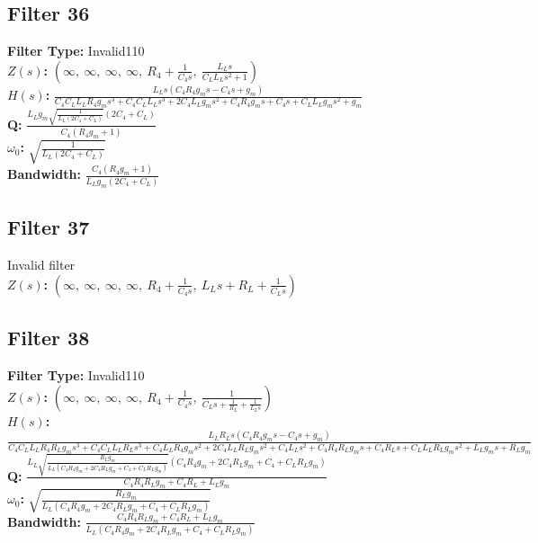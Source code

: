 \documentclass{article}
\begin{document}
\subsection*{Filter 36}
\textbf{Filter Type:} Invalid110 \\ 
\textbf{$Z(s)$:} $\left( \infty, \  \infty, \  \infty, \  \infty, \  R_{4} + \frac{1}{C_{4} s}, \  \frac{L_{L} s}{C_{L} L_{L} s^{2} + 1}\right)$ \\ 
\textbf{$H(s)$:} $\frac{L_{L} s \left(C_{4} R_{4} g_{m} s - C_{4} s + g_{m}\right)}{C_{4} C_{L} L_{L} R_{4} g_{m} s^{3} + C_{4} C_{L} L_{L} s^{3} + 2 C_{4} L_{L} g_{m} s^{2} + C_{4} R_{4} g_{m} s + C_{4} s + C_{L} L_{L} g_{m} s^{2} + g_{m}}$ \\ 
\textbf{Q:} $\frac{L_{L} g_{m} \sqrt{\frac{1}{L_{L} \left(2 C_{4} + C_{L}\right)}} \left(2 C_{4} + C_{L}\right)}{C_{4} \left(R_{4} g_{m} + 1\right)}$ \\ 
\textbf{$\omega_0$:} $\sqrt{\frac{1}{L_{L} \left(2 C_{4} + C_{L}\right)}}$ \\ 
\textbf{Bandwidth:} $\frac{C_{4} \left(R_{4} g_{m} + 1\right)}{L_{L} g_{m} \left(2 C_{4} + C_{L}\right)}$ \\ 
\subsection*{Filter 37}
Invalid filter \\ 
\textbf{$Z(s)$:} $\left( \infty, \  \infty, \  \infty, \  \infty, \  R_{4} + \frac{1}{C_{4} s}, \  L_{L} s + R_{L} + \frac{1}{C_{L} s}\right)$ \\ 
\subsection*{Filter 38}
\textbf{Filter Type:} Invalid110 \\ 
\textbf{$Z(s)$:} $\left( \infty, \  \infty, \  \infty, \  \infty, \  R_{4} + \frac{1}{C_{4} s}, \  \frac{1}{C_{L} s + \frac{1}{R_{L}} + \frac{1}{L_{L} s}}\right)$ \\ 
\textbf{$H(s)$:} $\frac{L_{L} R_{L} s \left(C_{4} R_{4} g_{m} s - C_{4} s + g_{m}\right)}{C_{4} C_{L} L_{L} R_{4} R_{L} g_{m} s^{3} + C_{4} C_{L} L_{L} R_{L} s^{3} + C_{4} L_{L} R_{4} g_{m} s^{2} + 2 C_{4} L_{L} R_{L} g_{m} s^{2} + C_{4} L_{L} s^{2} + C_{4} R_{4} R_{L} g_{m} s + C_{4} R_{L} s + C_{L} L_{L} R_{L} g_{m} s^{2} + L_{L} g_{m} s + R_{L} g_{m}}$ \\ 
\textbf{Q:} $\frac{L_{L} \sqrt{\frac{R_{L} g_{m}}{L_{L} \left(C_{4} R_{4} g_{m} + 2 C_{4} R_{L} g_{m} + C_{4} + C_{L} R_{L} g_{m}\right)}} \left(C_{4} R_{4} g_{m} + 2 C_{4} R_{L} g_{m} + C_{4} + C_{L} R_{L} g_{m}\right)}{C_{4} R_{4} R_{L} g_{m} + C_{4} R_{L} + L_{L} g_{m}}$ \\ 
\textbf{$\omega_0$:} $\sqrt{\frac{R_{L} g_{m}}{L_{L} \left(C_{4} R_{4} g_{m} + 2 C_{4} R_{L} g_{m} + C_{4} + C_{L} R_{L} g_{m}\right)}}$ \\ 
\textbf{Bandwidth:} $\frac{C_{4} R_{4} R_{L} g_{m} + C_{4} R_{L} + L_{L} g_{m}}{L_{L} \left(C_{4} R_{4} g_{m} + 2 C_{4} R_{L} g_{m} + C_{4} + C_{L} R_{L} g_{m}\right)}$ \\ 
\end{document}
